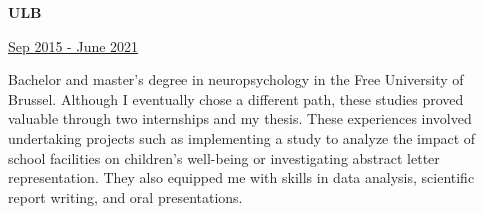 \documentclass[11pt, oneside, a4paper, titlepage]{article}
\begin{document}
\begin{tcolorbox}[colframe=white, colback=white]
\begin{minipage}[t]{0.60\linewidth}
    \vspace{0.5cm}

    \begin{minipage}{0.45\linewidth}
      \textbf{ULB}
    \end{minipage}
    \begin{minipage}{0.5\linewidth}
      \begin{flushright}
        \underline{Sep 2015 - June 2021}
      \end{flushright}
    \end{minipage}
    \vspace{0.4cm}

    \small{
      Bachelor and master's degree in neuropsychology in the Free University 
      of Brussel. Although I eventually chose a different path, these studies 
      proved valuable through two internships and my thesis. These experiences 
      involved undertaking projects such as implementing a study to analyze the 
      impact of school facilities on children's well-being or investigating 
      abstract letter representation. They also equipped me with skills in data 
      analysis, scientific report writing, and oral presentations.
    }

  \end{minipage}

\end{tcolorbox}
\end{document}
